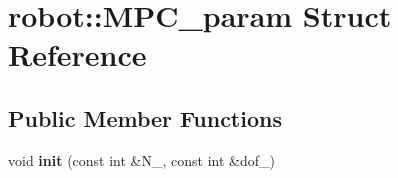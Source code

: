 \hypertarget{structrobot_1_1_m_p_c__param}{}\section{robot\+:\+:M\+P\+C\+\_\+param Struct Reference}
\label{structrobot_1_1_m_p_c__param}
\subsection*{Public Member Functions}
\begin{DoxyCompactItemize}
\item 
\mbox{\label{structrobot_1_1_m_p_c__param_acc5a892e5a973a13467ff20118063009}} 
void {\bfseries init} (const int \&N\+\_\+, const int \&dof\+\_\+)
\end{DoxyCompactItemize}
